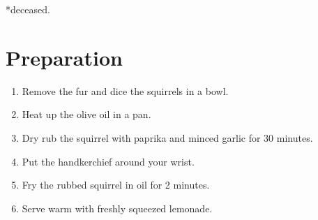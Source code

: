 \documentclass{article}
\begin{document}
*deceased.

\newpage

\section{Preparation}
\begin{enumerate}
    \item Remove the fur and dice the squirrels in a bowl.
    \item Heat up the olive oil in a pan.
    \item Dry rub the squirrel with paprika and minced garlic for 30 minutes.
    \item Put the handkerchief around your wrist.
    \item Fry the rubbed squirrel in oil for 2 minutes.
    \item Serve warm with freshly squeezed lemonade.
\end{enumerate}
\end{document}
